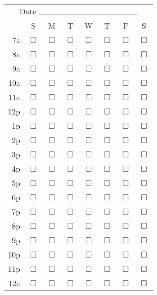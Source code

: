 \begin{tabular}{rccccccc}
\multicolumn{8}{c}{Date $\rule{5cm}{0.15mm}$} \\
     & S & M & T & W & T & F & S \\
7a & $\Box$ & $\Box$ & $\Box$ & $\Box$ & $\Box$ & $\Box$ & $\Box$ \\
8a & $\Box$ & $\Box$ & $\Box$ & $\Box$ & $\Box$ & $\Box$ & $\Box$ \\
9a & $\Box$ & $\Box$ & $\Box$ & $\Box$ & $\Box$ & $\Box$ & $\Box$ \\
10a & $\Box$ & $\Box$ & $\Box$ & $\Box$ & $\Box$ & $\Box$ & $\Box$ \\
11a & $\Box$ & $\Box$ & $\Box$ & $\Box$ & $\Box$ & $\Box$ & $\Box$ \\
12p & $\Box$ & $\Box$ & $\Box$ & $\Box$ & $\Box$ & $\Box$ & $\Box$ \\
1p & $\Box$ & $\Box$ & $\Box$ & $\Box$ & $\Box$ & $\Box$ & $\Box$ \\
2p & $\Box$ & $\Box$ & $\Box$ & $\Box$ & $\Box$ & $\Box$ & $\Box$ \\
3p & $\Box$ & $\Box$ & $\Box$ & $\Box$ & $\Box$ & $\Box$ & $\Box$ \\
4p & $\Box$ & $\Box$ & $\Box$ & $\Box$ & $\Box$ & $\Box$ & $\Box$ \\
5p & $\Box$ & $\Box$ & $\Box$ & $\Box$ & $\Box$ & $\Box$ & $\Box$ \\
6p & $\Box$ & $\Box$ & $\Box$ & $\Box$ & $\Box$ & $\Box$ & $\Box$ \\
7p & $\Box$ & $\Box$ & $\Box$ & $\Box$ & $\Box$ & $\Box$ & $\Box$ \\
8p & $\Box$ & $\Box$ & $\Box$ & $\Box$ & $\Box$ & $\Box$ & $\Box$ \\
9p & $\Box$ & $\Box$ & $\Box$ & $\Box$ & $\Box$ & $\Box$ & $\Box$ \\
10p & $\Box$ & $\Box$ & $\Box$ & $\Box$ & $\Box$ & $\Box$ & $\Box$ \\
11p & $\Box$ & $\Box$ & $\Box$ & $\Box$ & $\Box$ & $\Box$ & $\Box$ \\
12a & $\Box$ & $\Box$ & $\Box$ & $\Box$ & $\Box$ & $\Box$ & $\Box$
\end{tabular}